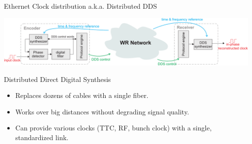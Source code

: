 \documentclass[compress,red]{beamer}
\begin{document}
\begin{frame}{Ethernet Clock distribution a.k.a. Distributed DDS}
  \begin{center}
    \includegraphics[width=\columnwidth]{applications/remote_dds.pdf}
  \end{center}
  \begin{block}{Distributed Direct Digital Synthesis}
    \begin{itemize}
    \item Replaces dozens of cables with a single fiber.
    \item Works over big distances without degrading signal quality.
    \item Can provide various clocks (TTC, RF, bunch clock) with a single, standardized link.
    \end{itemize}
  \end{block}
\end{frame}
\end{document}
